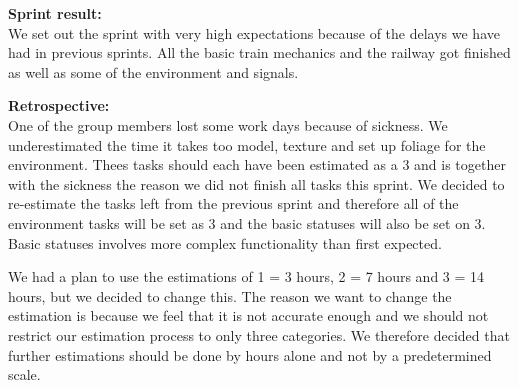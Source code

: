 \textbf{Sprint result:} \\
We set out the sprint with very high expectations because of the delays we have had in previous sprints. All the basic train mechanics and the railway got finished as well as some of the environment and signals. 

\textbf{Retrospective:} \\
One of the group members lost some work days because of sickness. We underestimated the time it takes too model, texture and set up foliage for the environment. Thees tasks should each have been estimated as a 3 and is together with the sickness the reason we did not finish all tasks this sprint. We decided to re-estimate the tasks left from the previous sprint and therefore all of the environment tasks will be set as 3 and the basic statuses will also be set on 3. Basic statuses involves more complex functionality than first expected. 

We had a plan to use the estimations of 1 = 3 hours, 2 = 7 hours and 3 = 14 hours, but we decided to change this. The reason we want to change the estimation is because we feel that it is not accurate enough and we should not restrict our estimation process to only three categories. We therefore decided that further estimations should be done by hours alone and not by a predetermined scale.


